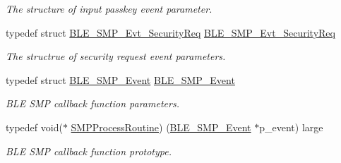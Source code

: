 \begin{DoxyCompactItemize}
\begin{DoxyCompactList}\small\item\em The structure of input passkey event parameter. \end{DoxyCompactList}\item 
typedef struct \hyperlink{struct_b_l_e___s_m_p___evt___security_req}{B\+L\+E\+\_\+\+S\+M\+P\+\_\+\+Evt\+\_\+\+Security\+Req} \hyperlink{group___b_l_e___s_m_p_ga713d242f374510c5a4183c086dcb3c60}{B\+L\+E\+\_\+\+S\+M\+P\+\_\+\+Evt\+\_\+\+Security\+Req}\hypertarget{group___b_l_e___s_m_p_ga713d242f374510c5a4183c086dcb3c60}{}\label{group___b_l_e___s_m_p_ga713d242f374510c5a4183c086dcb3c60}

\begin{DoxyCompactList}\small\item\em The structrue of security request event parameters. \end{DoxyCompactList}\item 
typedef struct \hyperlink{struct_b_l_e___s_m_p___event}{B\+L\+E\+\_\+\+S\+M\+P\+\_\+\+Event} \hyperlink{group___b_l_e___s_m_p_ga7f56616999b7aa1ece8a7e8b522b96a0}{B\+L\+E\+\_\+\+S\+M\+P\+\_\+\+Event}\hypertarget{group___b_l_e___s_m_p_ga7f56616999b7aa1ece8a7e8b522b96a0}{}\label{group___b_l_e___s_m_p_ga7f56616999b7aa1ece8a7e8b522b96a0}

\begin{DoxyCompactList}\small\item\em B\+LE S\+MP callback function parameters. \end{DoxyCompactList}\item 
typedef void($\ast$ \hyperlink{group___b_l_e___s_m_p_ga7f30c62e9c95a30117c43022a3153756}{S\+M\+P\+Process\+Routine}) (\hyperlink{struct_b_l_e___s_m_p___event}{B\+L\+E\+\_\+\+S\+M\+P\+\_\+\+Event} $\ast$p\+\_\+event) large\hypertarget{group___b_l_e___s_m_p_ga7f30c62e9c95a30117c43022a3153756}{}\label{group___b_l_e___s_m_p_ga7f30c62e9c95a30117c43022a3153756}

\begin{DoxyCompactList}\small\item\em B\+LE S\+MP callback function prototype. \end{DoxyCompactList}\end{DoxyCompactItemize}
